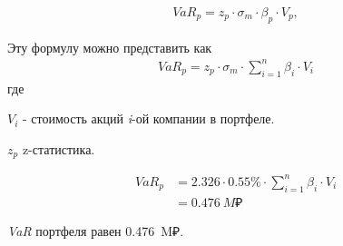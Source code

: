 \documentclass[12pt, table, twoside, a4paper]{exam}
\begin{document}
\begin{questions}
\begin{solution}[4em]
	
	\raggedright
	\begin{align}
	VaR_p=z_{p}\cdot \sigma_m\cdot  \beta_p\cdot  V_p,
	\end{align}
	
	Эту формулу можно представить как
	\begin{align}
	VaR_p=z_p \cdot \sigma_m \cdot \sum_{i=1}^n\beta_i \cdot V_i
	\end{align}
	где
	
	$V_i$ - стоимость акций \textit{i}-ой компании в портфеле.
	
	$z_p$ z-статистика.	
	
	\begin{align*}
		VaR_p&=2.326 \cdot 0.55\% \cdot \sum_{i=1}^n\beta_i \cdot V_i\\
		&=0.476~M₽
	\end{align*}
	
	
	\textit{VaR }портфеля равен 0.476~M₽.
\end{solution}

\end{questions}

\end{document}
